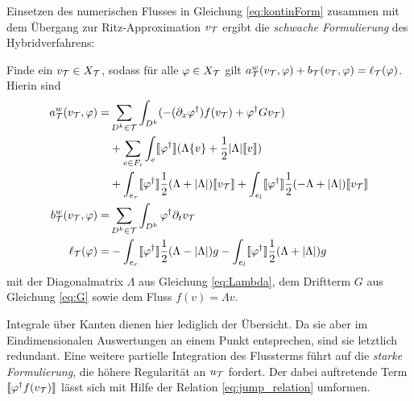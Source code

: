 Einsetzen des numerischen Flusses in Gleichung \eqref{eq:kontinForm} zusammen mit dem Übergang zur Ritz-Approximation $v_{\mathcal{T}}$ ergibt die \emph{schwache Formulierung} des Hybridverfahrens:
\begin{problem}
  \label{prob:weak}
  Finde ein ${v_{\mathcal{T}}\in X_{\mathcal{T}}}$, sodass für alle $\varphi\in X_{\mathcal{T}}$ gilt $a_{\mathcal{T}}^w(v_{\mathcal{T}}, \varphi) + b_{\mathcal{T}}(v_{\mathcal{T}}, \varphi) = \ell_{\mathcal{T}}(\varphi)$. Hierin sind
  \begin{align*}
    a_{\mathcal{T}}^w(v_{\mathcal{T}}, \varphi) = &\sum_{D^k\in\mathcal{T}}\int_{D^k} ( - (\partial_x \varphi^{\dagger}) f(v_{\mathcal{T}}) + \varphi^{\dagger} G v_{\mathcal{T}}) \nonumber \\
    &+ \sum_{e\in F_i}\int_{e}\llbracket \varphi^{\dagger} \rrbracket (\Lambda\{ v \} + \frac{1}{2}|\Lambda|\llbracket v \rrbracket) \\
    &+ \int_{e_r} \llbracket \varphi^{\dagger} \rrbracket \frac{1}{2}(\Lambda + |\Lambda|)\llbracket v_{\mathcal{T}} \rrbracket
    + \int_{e_l} \llbracket \varphi^{\dagger} \rrbracket \frac{1}{2}(-\Lambda + |\Lambda|)\llbracket v_{\mathcal{T}} \rrbracket \nonumber \\
    b_{\mathcal{T}}^w(v_{\mathcal{T}}, \varphi) = &\sum_{D^k\in\mathcal{T}}\int_{D^k} \varphi^{\dagger} \partial_t v_{\mathcal{T}} \\
    \ell_{\mathcal{T}}(\varphi)  = &-\int_{e_r} \llbracket \varphi^{\dagger} \rrbracket \frac{1}{2}(\Lambda - |\Lambda|)g
      -\int_{e_l} \llbracket \varphi^{\dagger} \rrbracket \frac{1}{2}(\Lambda + |\Lambda|)g
  \end{align*}
  mit der Diagonalmatrix $\Lambda$ aus Gleichung \eqref{eq:Lambda}, dem Driftterm $G$ aus Gleichung \eqref{eq:G} sowie dem Fluss ${f(v)=\Lambda v}$.
\end{problem}
Integrale über Kanten dienen hier lediglich der Übersicht. Da sie aber im Eindimensionalen Auswertungen an einem Punkt entsprechen, sind sie letztlich redundant. Eine weitere partielle Integration des Flussterms führt auf die \emph{starke Formulierung}, die höhere Regularität an $u_{\mathcal{T}}$ fordert. Der dabei auftretende Term $\llbracket \varphi^{\dagger}f(v_{\mathcal{T}}) \rrbracket$ lässt sich mit Hilfe der Relation \eqref{eq:jump_relation} umformen.

